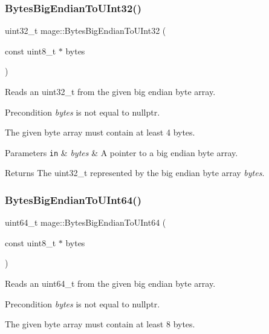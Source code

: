 \subsubsection{\texorpdfstring{Bytes\+Big\+Endian\+To\+U\+Int32()}{BytesBigEndianToUInt32()}}
{\footnotesize\ttfamily uint32\+\_\+t mage\+::\+Bytes\+Big\+Endian\+To\+U\+Int32 (\begin{DoxyParamCaption}\item[{const uint8\+\_\+t $\ast$}]{bytes }\end{DoxyParamCaption})}

Reads an uint32\+\_\+t from the given big endian byte array.

\begin{DoxyPrecond}{Precondition}
{\itshape bytes} is not equal to {\ttfamily nullptr}. 

The given byte array must contain at least 4 bytes. 
\end{DoxyPrecond}

\begin{DoxyParams}[1]{Parameters}
\mbox{\tt in}  & {\em bytes} & A pointer to a big endian byte array. \\
\hline
\end{DoxyParams}
\begin{DoxyReturn}{Returns}
The {\ttfamily uint32\+\_\+t} represented by the big endian byte array {\itshape bytes}. 
\end{DoxyReturn}
\hypertarget{namespacemage_a7509f9c1a6cf98056f2deaa8a2f45c7c}{}\label{namespacemage_a7509f9c1a6cf98056f2deaa8a2f45c7c} 
\subsubsection{\texorpdfstring{Bytes\+Big\+Endian\+To\+U\+Int64()}{BytesBigEndianToUInt64()}}
{\footnotesize\ttfamily uint64\+\_\+t mage\+::\+Bytes\+Big\+Endian\+To\+U\+Int64 (\begin{DoxyParamCaption}\item[{const uint8\+\_\+t $\ast$}]{bytes }\end{DoxyParamCaption})}

Reads an uint64\+\_\+t from the given big endian byte array.

\begin{DoxyPrecond}{Precondition}
{\itshape bytes} is not equal to {\ttfamily nullptr}. 

The given byte array must contain at least 8 bytes. 
\end{DoxyPrecond}

